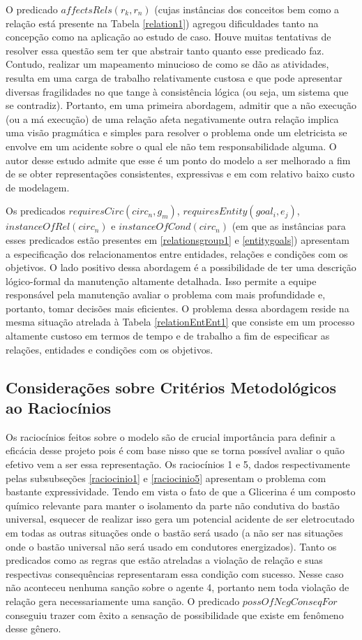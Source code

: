 O predicado $affectsRels(r_k,r_n)$ (cujas instâncias dos conceitos bem como a relação está presente na Tabela \ref{relation1}) agregou dificuldades tanto na concepção como na aplicação ao estudo de caso. Houve muitas tentativas de resolver essa questão sem ter que abstrair tanto quanto esse predicado faz. Contudo, realizar um mapeamento minucioso de como se dão as atividades, resulta em uma carga de trabalho relativamente custosa e que pode apresentar diversas fragilidades no que tange à consistência lógica (ou seja, um sistema que se contradiz). Portanto, em uma primeira abordagem, admitir que a não execução (ou a má execução) de uma relação afeta negativamente outra relação implica uma visão pragmática e simples para resolver o problema onde um eletricista se envolve em um acidente sobre o qual ele não tem responsabilidade alguma. O autor desse estudo admite que esse é um ponto do modelo a ser melhorado a fim de se obter representações consistentes, expressivas e em com relativo baixo custo de modelagem. 

Os predicados $requiresCirc(circ_n,g_m)$, $requiresEntity(goal_i, e_j)$, $instanceOfRel(circ_n)$ e $instanceOfCond(circ_n)$ (em que as instâncias para esses predicados estão presentes em \ref{relationsgroup1} e \ref{entitygoals}) apresentam a especificação dos relacionamentos entre entidades, relações e condições com os objetivos. O lado positivo dessa abordagem é a possibilidade de ter uma descrição lógico-formal da manutenção altamente detalhada. Isso permite a equipe responsável pela manutenção avaliar o problema com mais profundidade e, portanto, tomar decisões mais eficientes. O problema dessa abordagem reside na mesma situação atrelada à Tabela \ref{relationEntEnt1} que consiste em um processo altamente custoso em termos de tempo e de trabalho a fim de especificar as relações, entidades e condições com os objetivos. 

\subsection{Considerações sobre Critérios Metodológicos ao Raciocínios} \label{conscritmetrac}

Os raciocínios feitos sobre o modelo são de crucial importância para definir a eficácia desse projeto pois é com base nisso que se torna possível avaliar o quão efetivo vem a ser essa representação. Os raciocínios 1 e 5, dados respectivamente pelas subsubseções \ref{raciocinio1} e \ref{raciocinio5} apresentam o problema com bastante expressividade. Tendo em vista o fato de que a Glicerina  é um composto químico relevante para manter o isolamento da parte não condutiva do bastão universal, esquecer de realizar isso gera um potencial acidente de ser eletrocutado em todas as outras situações onde o bastão será usado (a não ser nas situações onde o bastão universal não será usado em condutores energizados). Tanto os predicados como as regras que estão atreladas a violação de relação e suas respectivas consequências representaram essa condição com sucesso. Nesse caso não aconteceu nenhuma sanção sobre o agente 4, portanto nem toda violação de relação gera necessariamente uma sanção. O predicado $possOfNegConseqFor$ conseguiu trazer com êxito a sensação de possibilidade que existe em fenômeno desse gênero. 

